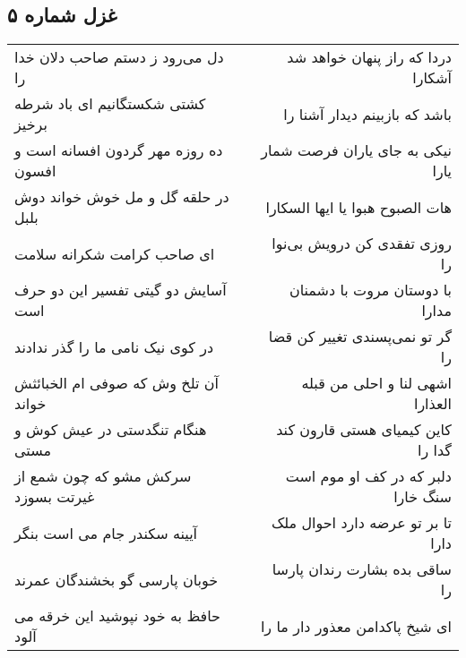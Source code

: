 \begin{center}
\section*{غزل شماره ۵}
\label{sec:sh005}
\begin{longtable}{l p{0.5cm} r}
دل می‌رود ز دستم صاحب دلان خدا را
&&
دردا که راز پنهان خواهد شد آشکارا
\\
کشتی شکستگانیم ای باد شرطه برخیز
&&
باشد که بازبینم دیدار آشنا را
\\
ده روزه مهر گردون افسانه است و افسون
&&
نیکی به جای یاران فرصت شمار یارا
\\
در حلقه گل و مل خوش خواند دوش بلبل
&&
هات الصبوح هبوا یا ایها السکارا
\\
ای صاحب کرامت شکرانه سلامت
&&
روزی تفقدی کن درویش بی‌نوا را
\\
آسایش دو گیتی تفسیر این دو حرف است
&&
با دوستان مروت با دشمنان مدارا
\\
در کوی نیک نامی ما را گذر ندادند
&&
گر تو نمی‌پسندی تغییر کن قضا را
\\
آن تلخ وش که صوفی ام الخبائثش خواند
&&
اشهی لنا و احلی من قبله العذارا
\\
هنگام تنگدستی در عیش کوش و مستی
&&
کاین کیمیای هستی قارون کند گدا را
\\
سرکش مشو که چون شمع از غیرتت بسوزد
&&
دلبر که در کف او موم است سنگ خارا
\\
آیینه سکندر جام می است بنگر
&&
تا بر تو عرضه دارد احوال ملک دارا
\\
خوبان پارسی گو بخشندگان عمرند
&&
ساقی بده بشارت رندان پارسا را
\\
حافظ به خود نپوشید این خرقه می آلود
&&
ای شیخ پاکدامن معذور دار ما را
\\
\end{longtable}
\end{center}
